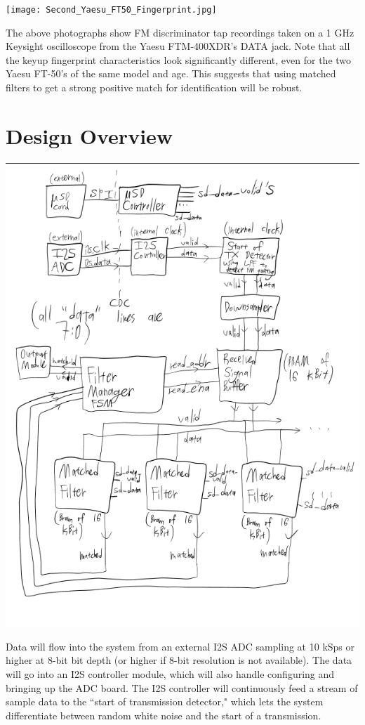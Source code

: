 \documentclass{article}
\begin{document}
\texttt{[image: Second\_Yaesu\_FT50\_Fingerprint.jpg]}

The above photographs show FM discriminator tap recordings taken on a 1 GHz Keysight oscilloscope from the Yaesu FTM-400XDR's DATA jack. Note that all the keyup fingerprint characteristics look significantly different, even for the two Yaesu FT-50's of the same model and age. This suggests that using matched filters to get a strong positive match for identification will be robust.

\section{Design Overview}

\includegraphics[width=8in]{Block_Diagram_Drawing.png}

Data will flow into the system from an external I2S ADC sampling at 10 kSps or higher at 8-bit bit depth (or higher if 8-bit resolution is not available). The data will go into an I2S controller module, which will also handle configuring and bringing up the ADC board. The I2S controller will continuously feed a stream of sample data to the ``start of transmission detector," which lets the system differentiate between random white noise and the start of a transmission.
\end{document}
